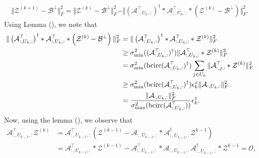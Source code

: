 \documentclass[aspectratio=169]{beamer}
\def\bcirc{{\rm bcirc}}
\def\fm#1{\mathcal{#1}}
\def\fm#1{\mathcal{#1}}
\def \a#1{\fm A_{:, #1, :}}
\begin{document}
\begin{frame}{}
\begin{align}
    \Vert   \fm Z^{(k+1)} - \fm B^\perp  \Vert_F^2  = \Vert  \fm Z^{(k)} - \fm B^\perp  \Vert_F^2 - \Vert  \left(\fm A^\top_{:, {U_k}, :} \right)^\dagger* \fm A^\top_{:, U_k, :} *\left( \fm Z ^{(k)}-\fm B^\perp \right) \Vert_F^2. \label{eq:eq-1b}
\end{align}
Using Lemma (), we  note that 
\begin{align}
    \Vert \left(\a{U_k}^\top \right)^\dagger * \a{U_k}^\top *\left(\fm Z^{(k)}-\fm B^\perp \right) \Vert_F^2 & =  \Vert \left(\a{U_k}^\top \right)^\dagger * \a{U_k}^\top *\fm Z^{(k)}\Vert_F^2 \notag\\
    & \geq \sigma_{\min}^2((\a{U_k}^\top) ^\dagger)\Vert \a{U_k}^\top * \fm Z^{(k)} \Vert_F^2 \notag\\
    & = \sigma_{\min}^2(\bcirc(\a{U_k}^\top) ^\dagger) \sum_{j\in U_k} \Vert \a j ^\top * \fm Z^{(k)} \Vert_F^2 \notag\\
    & \geq \sigma_{\min}^2(\bcirc(\a{U_k}^\top) ^\dagger) \epsilon^z_k \Vert \a{U_k} \Vert_F^2 \notag\\
    & =  \frac{\Vert \a{U_k} \Vert_F^2}{\sigma_{\max}^2(\bcirc(\a{U_k}^\top))} \epsilon_k^z .\label{eq:eq-2}
\end{align}
Now,  using the  lemma (), we observe that
\begin{align*}
    \a{U_{k-1}}^\top \fm Z^{(k)} & = \a{U_{k-1}}^\top \left( \fm Z^{(k-1)} - \a{U_{k-1}}*\a{U_{k-1}}^\dagger \fm Z^{k-1} \right)\\
    & =  \a{U_{k-1}}^\top*\fm Z^{(k-1)} - \a{U_{k-1}}^\top *\a{U_{k-1}}\a{U_{k-1}}^\dagger* \fm Z^{k-1} = \fm O, 
\end{align*}
\end{frame}
\end{document}
